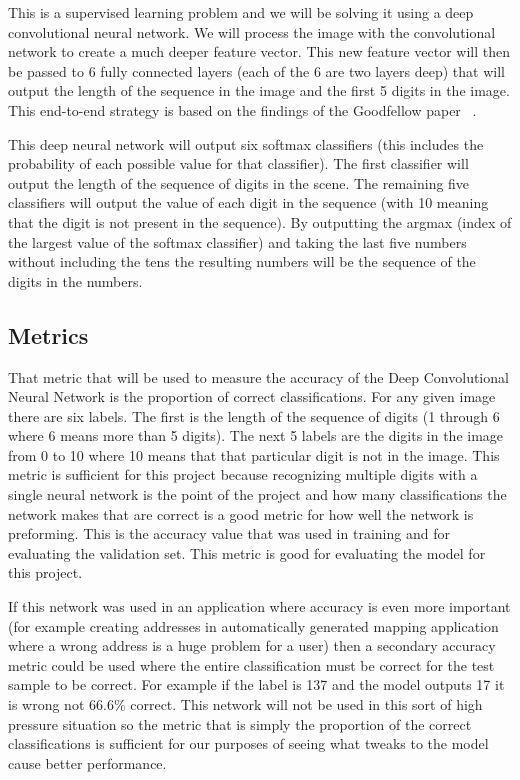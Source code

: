 \documentclass[12pt,twocolumn,letterpaper]{article}
\begin{document}
This is a supervised learning problem and we will be solving it using a deep 
convolutional neural network. We will process the image with the convolutional 
network to create a much deeper feature vector. This new feature vector will then 
be passed to 6 fully connected layers (each of the 6 are two layers deep) that 
will output the length of the sequence in the image and the first 5 digits in 
the image. This end-to-end strategy is based on the findings of the 
Goodfellow \etal paper ~\cite{goodfellow}. 

This deep neural network will output six softmax classifiers (this includes the 
probability of each possible value for that classifier). The first classifier 
will output the length of the sequence of digits in the scene. The remaining five 
classifiers will output the value of each digit in the sequence (with 10 meaning 
that the digit is not present in the sequence). By outputting the argmax (index 
of the largest value of the softmax classifier) and taking the last five numbers 
without including the tens the resulting numbers will be the sequence of the 
digits in the numbers. 

\subsection{Metrics}
That metric that will be used to measure the accuracy of the Deep Convolutional 
Neural Network is the proportion of correct classifications. For any given image 
there are six labels. The first is the length of the sequence of digits (1 through
6 where 6 means more than 5 digits). The next 5 labels are the digits in the 
image from 0 to 10 where 10 means that that particular digit is not in the image.
This metric is sufficient for this project because recognizing multiple digits 
with a single neural network is the point of the project and how many 
classifications the network makes that are correct is a good metric for how well the
network is preforming. This is the accuracy value that was used in training and 
for evaluating the validation set. This metric is good for evaluating the model 
for this project. 

If this network was used in an application where accuracy is 
even more important (for example creating addresses in automatically generated 
mapping application where a wrong address is a huge problem for a user) then a 
secondary accuracy metric could be used where
the entire classification must be correct for the test sample to be correct. For 
example if the label is 137 and the model outputs 17 it is wrong not 66.6\% 
correct. This network will not be used in this sort of high pressure situation so
the metric that is simply the proportion of the correct classifications is 
sufficient for our purposes of seeing what tweaks to the model cause better 
performance.
\end{document}
